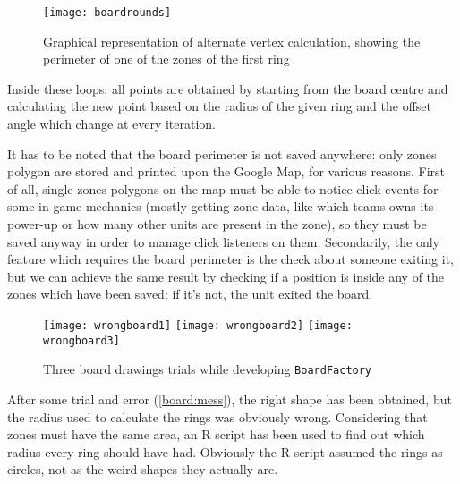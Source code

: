 			\begin{figure}[htp]
				\centering
				\texttt{[image: boardrounds]}
				\caption{Graphical representation of alternate vertex calculation, showing the perimeter of one of the zones of the first ring}\label{board:alternate}
			\end{figure}
			
			Inside these loops, all points are obtained by starting from the board centre and calculating the new point based on the radius of the given ring and the offset angle which change at every iteration.
			
			
			
			It has to be noted that the board perimeter is not saved anywhere: only zones polygon are stored and printed upon the Google Map, for various reasons.
			First of all, single zones polygons on the map must be able to notice click events for some in-game mechanics (mostly getting zone data, like which teams owns its power-up or how many other units are present in the zone), so they must be saved anyway in order to manage click listeners on them.
			Secondarily, the only feature which requires the board perimeter is the check about someone exiting it, but we can achieve the same result by checking if a position is inside any of the zones which have been saved: if it's not, the unit exited the board.
			
			\begin{figure}[htp]
				\centering
				\texttt{[image: wrongboard1]}
				\hfill %
				\texttt{[image: wrongboard2]}
				\hfill
				\texttt{[image: wrongboard3]}
				
				\caption{Three board drawings trials while developing \lstinline|BoardFactory|}\label{board:mess}
			\end{figure}
			
			After some trial and error (\autoref{board:mess}), the right shape has been obtained, but the radius used to calculate the rings was obviously wrong.
			Considering that zones must have the same area, an R script has been used to find out which radius every ring should have had. Obviously the R script assumed the rings as circles, not as the weird shapes they actually are.
			
